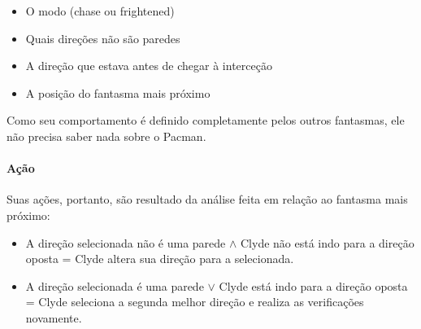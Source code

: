 \documentclass[12pt]{article}
\begin{document}
\begin{itemize}
    \item O modo (chase ou frightened)
    \item Quais direções não são paredes
    \item A direção que estava antes de chegar à interceção
    \item A posição do fantasma mais próximo
\end{itemize}

Como seu comportamento é definido completamente pelos outros fantasmas, ele não precisa saber nada sobre o Pacman.

\paragraph*{Ação} 
Suas ações, portanto, são resultado da análise feita em relação ao fantasma mais próximo:

\begin{itemize}
    \item A direção selecionada não é uma parede $\land$ Clyde não está indo para a direção oposta = Clyde altera sua direção para a selecionada.
    
    \item A direção selecionada é uma parede $\lor$ Clyde está indo para a direção oposta = Clyde seleciona a segunda melhor direção e realiza as verificações novamente.
\end{itemize}
\end{document}
